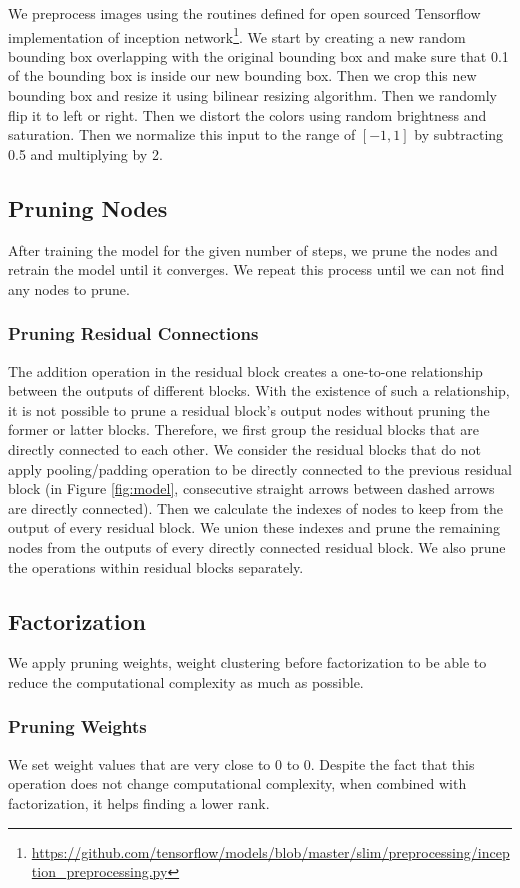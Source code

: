 We preprocess images using the routines defined for open sourced Tensorflow implementation of inception network\footnote{\url{https://github.com/tensorflow/models/blob/master/slim/preprocessing/inception_preprocessing.py}}. We start by creating a new random bounding box overlapping with the original bounding box and make sure that 0.1 of the bounding box is inside our new bounding box. Then we crop this new bounding box and resize it using bilinear resizing algorithm. Then we randomly flip it to left or right. Then we distort the colors using random brightness and saturation. Then we normalize this input to the range of $[-1,1]$ by subtracting 0.5 and multiplying by 2. 

\subsection{Pruning Nodes}
After training the model for the given number of steps, we prune the nodes and retrain the model until it converges. We repeat this process until we can not find any nodes to prune.

\subsubsection{Pruning Residual Connections}
The addition operation in the residual block creates a one-to-one relationship between the outputs of different blocks. With the existence of such a relationship, it is not possible to prune a residual block's output nodes without pruning the former or latter blocks. Therefore, we first group the residual blocks that are directly connected to each other. We consider the residual blocks that do not apply pooling/padding operation to be directly connected to the previous residual block (in Figure \ref{fig:model}, consecutive straight arrows between dashed arrows are directly connected). Then we calculate the indexes of nodes to keep from the output of every residual block. We union these indexes and prune the remaining nodes from the outputs of every directly connected residual block. We also prune the operations within residual blocks separately. 

\subsection{Factorization}
We apply pruning weights, weight clustering before factorization to be able to reduce the computational complexity as much as possible.

\subsubsection{Pruning Weights}
We set weight values that are very close to $0$ to $0$. Despite the fact that this operation does not change computational complexity, when combined with factorization, it helps finding a lower rank.

